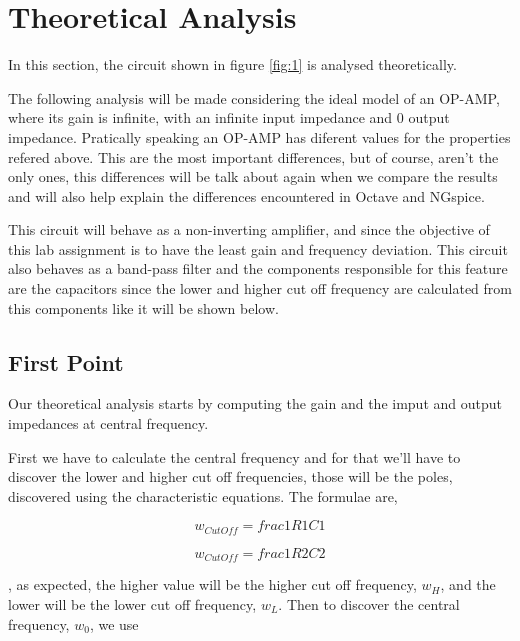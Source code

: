 \section{Theoretical Analysis}
\label{sec:theoretical}

\par In this section, the circuit shown in figure \ref{fig:1} is analysed theoretically.
\par The following analysis will be made considering the ideal model of an OP-AMP, where its gain is infinite, with an infinite input impedance and 0 output impedance. Pratically speaking an OP-AMP has diferent values for the properties refered above. This are the most important differences, but of course, aren't the only ones, this differences will be talk about again when we compare the results and will also help explain the differences encountered in Octave and NGspice.  
\par This circuit will behave as a non-inverting amplifier, and since the objective of this lab assignment is to have the least gain and frequency deviation. This circuit also behaves as a band-pass filter and the components responsible for this feature are the capacitors since the lower and higher cut off frequency are calculated from this components like it will be shown below.

\subsection{First Point}

\par Our theoretical analysis starts by computing the gain and the imput and output impedances at central frequency.
\par First we have to calculate the central frequency and for that we'll have to discover the lower and higher cut off frequencies, those will be the poles, discovered using the characteristic equations. The formulae are,

\begin{equation}
	w_{CutOff} = frac{1}{R1C1}
\end{equation}

\begin{equation}
	w_{CutOff} = frac{1}{R2C2}
\end{equation}

, as expected, the higher value will be the higher cut off frequency, $w_H$, and the lower will be the lower cut off frequency, $w_L$. Then to discover the central frequency, $w_0$, we use 

